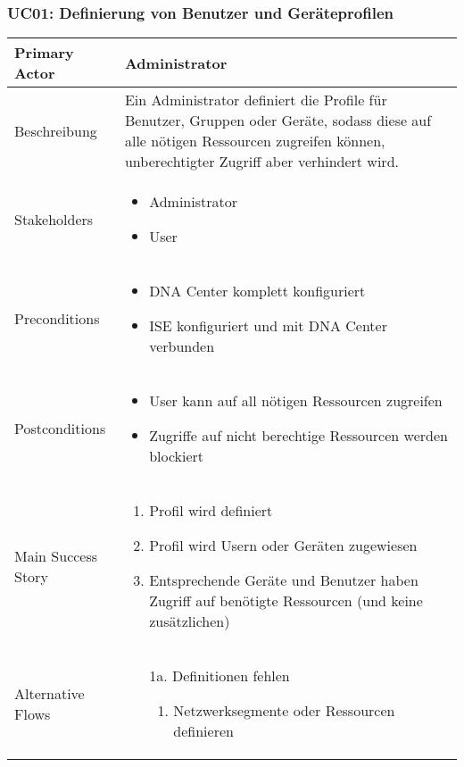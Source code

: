\subsubsection{UC01: Definierung von Benutzer und Geräteprofilen}
\begin{table}[H]
	\centering
	\begin{tabularx}{\textwidth}{l | X}
		Primary Actor      & Administrator        \\
		\hline
		Beschreibung       & Ein Administrator definiert die Profile für Benutzer, Gruppen oder Geräte, sodass diese auf alle nötigen Ressourcen zugreifen können, unberechtigter Zugriff aber verhindert wird. \\ 
		\hline
		Stakeholders       &  
		\begin{itemize}	
			\item Administrator
			\item User
		\end{itemize}              \\
		\hline
		Preconditions      & 
		\begin{itemize}	
			\item DNA Center komplett konfiguriert
			\item ISE konfiguriert und mit DNA Center verbunden
		\end{itemize}  \\
		\hline
		Postconditions     & 
		\begin{itemize}	
			\item User kann auf all nötigen Ressourcen zugreifen
			\item Zugriffe auf nicht berechtige Ressourcen werden blockiert
		\end{itemize}  \\
		\hline
		Main Success Story & 
		\begin{enumerate}
			\item Profil wird definiert
			\item Profil wird Usern oder Geräten zugewiesen
			\item Entsprechende Geräte und Benutzer haben Zugriff auf benötigte Ressourcen (und keine zusätzlichen)
		\end{enumerate}
		\\
		\hline
		Alternative Flows  & 
		\begin{itemize}
			\item[1a.] Definitionen fehlen
			\begin{enumerate}
				\item Netzwerksegmente oder Ressourcen definieren

\end{enumerate}
\end{itemize}
\end{tabularx}
\end{table}
